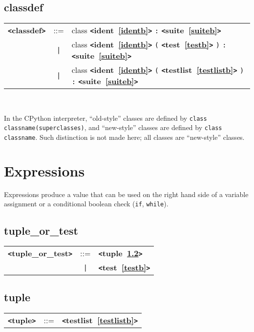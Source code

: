 \documentclass[12pt]{article}
\begin{document}
\subsection{classdef}
\label{classdefb}
\begin{tabular}{lcl}
{\bf \verb+<+classdef\verb+>+} & ::=  & class {\bf \verb+<+ident~\ref{identb}\verb+>+}  \verb|:| {\bf \verb+<+suite~\ref{suiteb}\verb+>+}  \\
 & \verb+|+  & class {\bf \verb+<+ident~\ref{identb}\verb+>+}  \verb|(| {\bf \verb+<+test~\ref{testb}\verb+>+}  \verb|)| \verb|:| {\bf \verb+<+suite~\ref{suiteb}\verb+>+}  \\
 & \verb+|+  & class {\bf \verb+<+ident~\ref{identb}\verb+>+}  \verb|(| {\bf \verb+<+testlist~\ref{testlistb}\verb+>+}  \verb|)| \verb|:| {\bf \verb+<+suite~\ref{suiteb}\verb+>+}  \\
\end{tabular} \\


In the CPython interpreter, ``old-style'' classes are defined by
\verb+class classname(superclasses)+, and ``new-style'' classes are defined by 
\verb+class classname+.  Such distinction is not made here; all classes
are ``new-style'' classes.

\section{Expressions}
Expressions produce a value that can be used on the right hand side of a variable assignment or a conditional boolean check (\verb|if|, \verb|while|).

\subsection{tuple\_or\_test}
\label{tuplezzzorzzztestb}
\begin{tabular}{lcl}
{\bf \verb+<+tuple\_or\_test\verb+>+} & ::=  & {\bf \verb+<+tuple~\ref{tupleb}\verb+>+}  \\
 & \verb+|+  & {\bf \verb+<+test~\ref{testb}\verb+>+}  \\
\end{tabular}

\subsection{tuple}
\label{tupleb}
\begin{tabular}{lcl}
{\bf \verb+<+tuple\verb+>+} & ::=  & {\bf \verb+<+testlist~\ref{testlistb}\verb+>+}  \\
\end{tabular} \\
\end{document}
